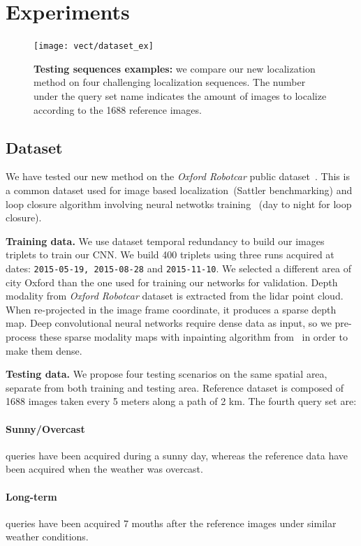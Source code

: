 \section{Experiments}
\label{sec:experiments}

\begin{figure}
	\center
	\texttt{[image: vect/dataset\_ex]}
	\caption{\label{fig:dataset} \textbf{Testing sequences examples:} we compare our new localization method on four challenging localization sequences. The number under the query set name indicates the amount of images to localize according to the 1688 reference images.}
\end{figure}

\subsection{Dataset}
\label{subsec:dataset}
	We have tested our new method on the \textit{Oxford Robotcar} public dataset~\cite{Maddern2016}. This is a common dataset used for image based localization~\cite{}(Sattler benchmarking) and loop closure algorithm involving neural netwotks training~\cite{} (day to night for loop closure).
		
\noindent\textbf{Training data.}
	We use dataset temporal redundancy to build our images triplets to train our CNN. We build 400 triplets using three runs acquired at dates: \texttt{2015-05-19, 2015-08-28} and \texttt{2015-11-10}. We selected a different area of city Oxford than the one used for training our networks for validation.
	Depth modality from \textit{Oxford Robotcar} dataset is extracted from the lidar point cloud. When re-projected in the image frame coordinate, it produces a sparse depth map. Deep convolutional neural networks require dense data as input, so we pre-process these sparse modality maps with inpainting algorithm from~\cite{Bevilacqua2017} in order to make them dense.

\noindent\textbf{Testing data.} We propose four testing scenarios on the same spatial area, separate from both training and testing area. Reference dataset is composed of 1688 images taken every 5 meters along a path of 2 km. The fourth query set are:
	\paragraph{Sunny/Overcast} queries have been acquired during a sunny day, whereas the reference data have been acquired when the weather was overcast.
	\paragraph{Long-term} queries have been acquired 7 mouths after the reference images under similar weather conditions.
